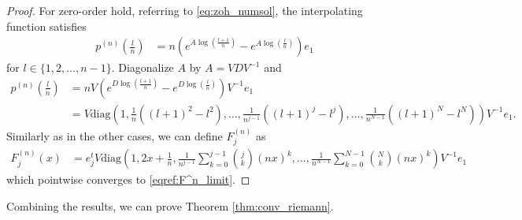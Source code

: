 \documentclass{article}
\theoremstyle{definition}
\newcommand{\pr}[1]{ \left( #1 \right) }
\begin{document}
\begin{proof}
    For zero-order hold, referring to \eqref{eq:zoh_numsol}, the interpolating function satisfies
    \begin{align*}
        p^{(n)} \pr{\frac{l}{n}} &= n \pr{e^{A\log\pr{\frac{l+1}{n}}} - e^{A\log\pr{\frac{l}{n}}}} e_1
    \end{align*}
    for $l \in \{1,2, \dots, n-1\}$. Diagonalize $A$ by $A = VDV^{-1}$ and 
    \begin{align*}
        p^{(n)} \pr{\frac{l}{n}} &= n V \pr{e^{D\log\pr{\frac{l+1}{n}}} - e^{D\log\pr{\frac{l}{n}}}} V^{-1} e_1 \\
        &= V \text{diag}
        \pr{1, \frac{1}{n} \pr{\pr{l+1}^2 - l^2}, \dots, 
        \frac{1}{n^{j-1}} \pr{\pr{l+1}^j-l^j}, \dots,
        \frac{1}{n^{N-1}} \pr{\pr{l+1}^N-l^N}
        } V^{-1} e_1.
    \end{align*}
    Similarly as in the other cases, we can define $F_j^{(n)}$ as 
    \begin{align*}
        F_j^{(n)} (x)
        &= e_j^t V \text{diag} \pr{
        1, 2x + \frac{1}{n}, 
        \frac{1}{n^{j-1}} \sum_{k=0}^{j-1} \binom{j}{k} \pr{nx}^k, \dots,
        \frac{1}{n^{N-1}} \sum_{k=0}^{N-1} \binom{N}{k} \pr{nx}^k
        }V^{-1}e_1
    \end{align*}
    which pointwise converges to \eqref{eqref:F^n_limit}.
\end{proof}

Combining the results, we can prove Theorem \ref{thm:conv_riemann}.
\end{document}
